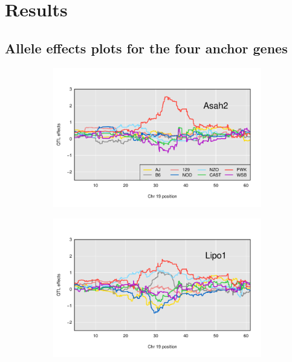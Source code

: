 \documentclass{article}
\begin{document}
\section{Results}

\subsection{Allele effects plots for the four anchor genes}

\begin{figure}
    \begin{subfigure}[t]{0.5\textwidth}
        \includegraphics[width = \textwidth]{../Rmd/allele_effects_Asah2.pdf}
    \end{subfigure}%
    \begin{subfigure}[t]{0.5\textwidth}
        \includegraphics[width = \textwidth]{../Rmd/allele_effects_Lipo1.pdf}
    \end{subfigure}%
    

\end{figure}
\end{document}

